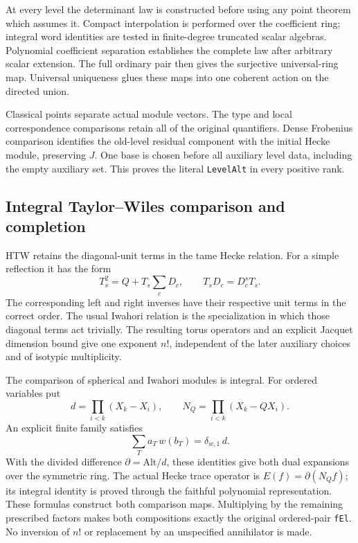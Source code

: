 At every level the determinant law is constructed before using
any point theorem which assumes it.  Compact interpolation is
performed over the coefficient ring; integral word identities
are tested in finite-degree truncated scalar algebras.  Polynomial
coefficient separation establishes the complete law after
arbitrary scalar extension.  The full ordinary pair then gives
the surjective universal-ring map.  Universal uniqueness glues
these maps into one coherent action on the directed union.

Classical points separate actual module vectors.  The type and
local correspondence comparisons retain all of the original
quantifiers.  Dense Frobenius comparison identifies the old-level
residual component with the initial Hecke module, preserving
$J$.  One base is chosen before all auxiliary level data,
including the empty auxiliary set.  This proves the literal
\texttt{LevelAlt} in every positive rank.

\subsection{Integral Taylor--Wiles comparison and completion}

HTW retains the diagonal-unit terms in the tame Hecke relation.
For a simple reflection it has the form
\[
 T_s^2=Q+T_s\sum_c D_c,\qquad T_sD_c=D_c^sT_s.
\]
The corresponding left and right inverses have their respective
unit terms in the correct order.  The usual Iwahori relation is
the specialization in which those diagonal terms act trivially.
The resulting torus operators and an explicit Jacquet dimension
bound give one exponent $n!$, independent of the later auxiliary
choices and of isotypic multiplicity.

The comparison of spherical and Iwahori modules is integral.
For ordered variables put
\[
 d=\prod_{i<k}(X_k-X_i),\qquad
 N_Q=\prod_{i<k}(X_k-QX_i).
\]
An explicit finite family satisfies
\[
              \sum_T a_T\,w(b_T)=\delta_{w,1}\,d.
\]
With the divided difference $\partial=\mathrm{Alt}/d$, these
identities give both dual expansions over the symmetric ring.
The actual Hecke trace operator is
$E(f)=\partial(N_Qf)$; its integral identity is proved through
the faithful polynomial representation.  These formulas construct
both comparison maps.  Multiplying by the remaining prescribed
factors makes both compositions exactly the original ordered-pair
\texttt{fEl}.  No inversion of $n!$ or replacement by an
unspecified annihilator is made.

